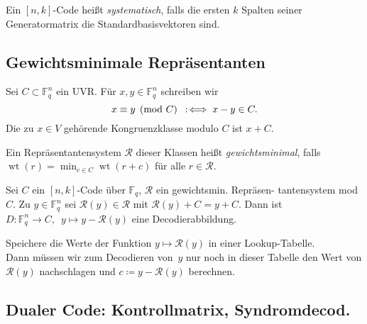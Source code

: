\documentclass{cheat-sheet}
\newcommand{\F}{\mathbb{F}} %
\DeclareMathOperator{\wt}{wt} %
\begin{document}
\begin{defn}
  Ein $[n,k]$-Code heißt \emph{systematisch}, falls die ersten $k$ Spalten seiner Generatormatrix die Standardbasisvektoren sind.
\end{defn}

\subsection{Gewichtsminimale Repräsentanten}

\begin{nota}
  Sei $C \subset \F_q^n$ ein UVR. Für $x, y \in \F_q^n$ schreiben wir
  \[ x \equiv y \pmod{C} \enspace:\!\iff x-y \in C. \]
  Die zu $x \in V$ gehörende Kongruenzklasse modulo $C$ ist $x + C$.
\end{nota}

\begin{defn}
  Ein Repräsentantensystem $\mathcal{R}$ dieser Klassen heißt \emph{gewichtsminimal}, falls $\wt(r) = \min_{c \in C} \wt(r+c)$ für alle $r \in \mathcal{R}$.
\end{defn}

\begin{satz}
  Sei $C$ ein $[n, k]$-Code über $\F_q$, $\mathcal{R}$ ein gewichtsmin. Repräsen- tantensystem mod $C$.
  Zu $y \in \F_q^n$ sei $\mathcal{R}(y) \in \mathcal{R}$ mit $\mathcal{R}(y) + C = y + C$.
  Dann ist $D : \F_q^n \to C, \enspace y \mapsto y - \mathcal{R}(y)$ eine Decodierabbildung.
\end{satz}

\begin{samepage}

\begin{verf}
  Speichere die Werte der Funktion $y \mapsto \mathcal{R}(y)$ in einer Lookup-Tabelle. \\
  Dann müssen wir zum Decodieren von~$y$ nur noch in dieser Tabelle den Wert von $\mathcal{R}(y)$ nachschlagen und $c \coloneqq y - \mathcal{R}(y)$ berechnen.
\end{verf}


\subsection{Dualer Code: Kontrollmatrix, Syndromdecod.}

\end{samepage}
\end{document}
